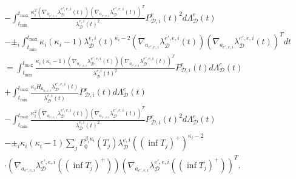 \documentclass[honours,12pt]{unswthesis}
\numberwithin{equation}{section}
\begin{document}
\begin{equation*}
\begin{align}
		&- \int_{t_\mathrm{min}}^{t_\mathrm{max}} \frac{\kappa_i^2 (\nabla_{a_{e',e,i}}\lambda_\mathcal{D}^{e',e,i}(t)) (\nabla_{a_{e',e,i}}\lambda_\mathcal{D}^{e',e,i}(t))^T }{\lambda_\mathcal{D}^{e,i}(t)^2} P_{\mathcal{D},i}^e(t)^2 d\Lambda_\mathcal{D}^e(t) \\
		&- \pm_i\int_{t_\mathrm{min}}^{t_\mathrm{max}} \kappa_i(\kappa_i-1) \lambda_\mathcal{D}^{e,i}(t)^{\kappa_i-2} \left(\nabla_{a_{e',e,i}}\lambda_\mathcal{D}^{e',e,i}(t)\right) \left(\nabla_{a_{e',e,i}}\lambda_\mathcal{D}^{e',e,i}(t)\right)^T dt \\
		&= \int_{t_\mathrm{min}}^{t_\mathrm{max}} \frac{\kappa_i(\kappa_i-1) (\nabla_{a_{e',e,i}}\lambda_\mathcal{D}^{e',e,i}(t)) (\nabla_{a_{e',e,i}}\lambda_\mathcal{D}^{e',e,i}(t))^T }{\lambda_\mathcal{D}^{e,i}(t)^2} P_{\mathcal{D},i}^e(t) d\Lambda_\mathcal{D}^e(t) \\
		&+ \int_{t_\mathrm{min}}^{t_\mathrm{max}} \frac{\kappa_i H_{a_{a',e,i}}\lambda_\mathcal{D}^{e',e,i}(t)}{\lambda_\mathcal{D}^{e,i}(t)} P_{\mathcal{D},i}^e(t) d\Lambda_\mathcal{D}^e(t) \\
		&- \int_{t_\mathrm{min}}^{t_\mathrm{max}} \frac{\kappa_i^2 (\nabla_{a_{e',e,i}}\lambda_\mathcal{D}^{e',e,i}(t)) (\nabla_{a_{e',e,i}}\lambda_\mathcal{D}^{e',e,i}(t))^T }{\lambda_\mathcal{D}^{e,i}(t)^2} P_{\mathcal{D},i}^e(t)^2 d\Lambda_\mathcal{D}^e(t) \\
		&- \pm_i\kappa_i(\kappa_i-1) \sum_j \Gamma_0^{\beta_i\kappa_i}(T_j)\lambda_\mathcal{D}^{e,i} ((\inf T_j)^+)^{\kappa_i-2} \\
		&\cdot \left(\nabla_{a_{e',e,i}}\lambda_\mathcal{D}^{e',e,i}((\inf T_j)^+)\right) \left(\nabla_{a_{e',e,i}}\lambda_\mathcal{D}^{e',e,i}((\inf T_j)^+)\right)^T. \\
	\end{align}
\end{equation*}
\end{document}
